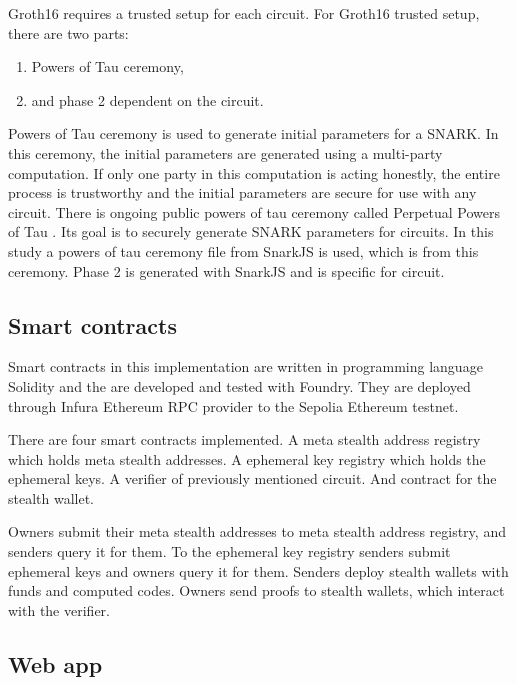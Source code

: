 \documentclass[conference,comsoc,10pt]{IEEEtran}
\begin{document}
        Groth16 requires a trusted setup for each circuit. For Groth16 trusted
        setup, there are two parts:
        \begin{enumerate}
            \item Powers of Tau ceremony\cite{PowersOfTau},
            \item and phase 2 dependent on the circuit.
        \end{enumerate}
        Powers of Tau ceremony is used to generate initial parameters for a SNARK.
        In this ceremony, the initial parameters are generated using a multi-party
        computation. If only one party in this computation is acting honestly,
        the entire process is trustworthy and the initial parameters are secure
        for use with any circuit. There is ongoing public powers of tau ceremony
        called Perpetual Powers of Tau \cite{PerpetualPTAU}. Its goal is to
        securely generate SNARK parameters for circuits. In this study a powers
        of tau ceremony file from SnarkJS\cite{snarkjs} is used, which is from
        this ceremony. Phase 2 is generated with SnarkJS\cite{snarkjs} and is
        specific for circuit.

    \subsection{Smart contracts}

        Smart contracts in this implementation are written in programming
        language Solidity\cite{solidity} and the are developed and tested
        with Foundry\cite{foundry}. They are deployed through
        Infura\cite{infura} Ethereum RPC provider to the Sepolia Ethereum
        testnet\cite{sepolia}.

        There are four smart contracts implemented. A meta stealth address
        registry which holds meta stealth addresses. A ephemeral key registry
        which holds the ephemeral keys. A verifier of previously mentioned
        circuit. And contract for the stealth wallet.

        Owners submit their meta stealth addresses to meta stealth address registry,
        and senders query it for them. To the ephemeral key registry senders submit
        ephemeral keys and owners query it for them. Senders deploy stealth wallets
        with funds and computed codes. Owners send proofs to stealth wallets,
        which interact with the verifier.

    \subsection{Web app}
\end{document}

